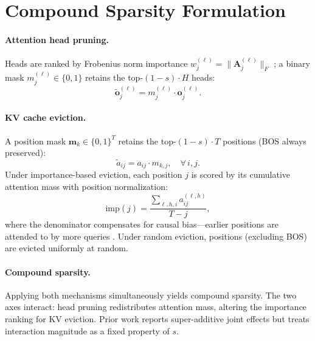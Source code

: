 \section{Compound Sparsity Formulation}
\label{app:formulation-details}

\paragraph{Attention head pruning.}
Heads are ranked by Frobenius norm importance $w_j^{(\ell)} = \|\mathbf{A}_j^{(\ell)}\|_F$ \cite{voita-acl2019, michel-neurips2019}; a binary mask $m_j^{(\ell)} \in \{0,1\}$ retains the top-$(1{-}s)\cdot H$ heads:
\begin{equation}
    \tilde{\mathbf{o}}_j^{(\ell)} = m_j^{(\ell)} \cdot \mathbf{o}_j^{(\ell)}.
    \label{eq:head-mask}
\end{equation}

\paragraph{KV cache eviction.}
A position mask $\mathbf{m}_k \in \{0,1\}^T$ retains the top-$(1{-}s)\cdot T$ positions (BOS always preserved):
\begin{equation}
    \tilde{a}_{ij} = a_{ij} \cdot m_{k,j}, \quad \forall\, i, j.
    \label{eq:kv-mask}
\end{equation}
Under importance-based eviction, each position $j$ is scored by its cumulative attention mass with position normalization:
\begin{equation}
    \mathrm{imp}(j) = \frac{\sum_{\ell, h, i} a_{ij}^{(\ell,h)}}{T - j},
    \label{eq:kv-importance}
\end{equation}
where the denominator compensates for causal bias---earlier positions are attended to by more queries \cite{thinkv-iclr2026, defensivekv-iclr2026}. Under random eviction, positions (excluding BOS) are evicted uniformly at random.

\paragraph{Compound sparsity.}
Applying both mechanisms simultaneously yields compound sparsity. The two axes interact: head pruning redistributes attention mass, altering the importance ranking for KV eviction. Prior work \cite{spark-aaai2026} reports super-additive joint effects but treats interaction magnitude as a fixed property of $s$.

